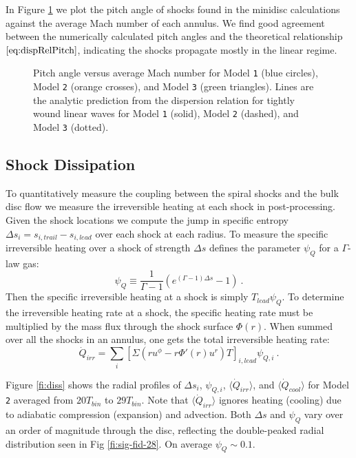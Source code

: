 \documentclass{emulateapj}
\newcommand{\Gam}{\Gamma}
\newcommand{\De}{\Delta}
\newcommand{\model}[1]{{Model \texttt{#1}}}
\newcommand{\avet}[1]{ \langle #1 \rangle}
\begin{document}
In Figure \ref{fi:disp} we plot the pitch angle of shocks found in the minidisc calculations against the average Mach number of each annulus. We find good agreement between the numerically calculated pitch angles and the theoretical relationship $\eqref{eq:dispRelPitch}$, indicating the shocks propagate mostly in the linear regime.

\begin{figure}
\caption{\label{fi:disp} Pitch angle versus average Mach number for \model{1} (blue circles), \model{2} (orange crosses), and \model{3} (green triangles). Lines are the analytic prediction from the dispersion relation for tightly wound linear waves for \model{1} (solid), \model{2} (dashed), and \model{3} (dotted).}
\end{figure}



\subsection{Shock Dissipation}
\label{subsec:diss}

To quantitatively measure the coupling between the spiral shocks and the bulk disc flow we measure the irreversible heating at each shock in post-processing.  Given the shock locations we compute the jump in specific entropy $\Delta s_i = s_{i,trail} - s_{i,lead}$ over each shock at each radius.  To measure the specific irreversible heating over a shock of strength $\De s$ \cite{Rafikov16} defines the parameter $\psi_Q$ for a $\Gam$-law gas:
\begin{equation}
	\psi_Q \equiv \frac{1}{\Gam - 1} \left( e^{(\Gam -1)\De s } - 1 \right) \ . \label{eq:def-psi}
\end{equation}
Then the specific irreversible heating at a shock is simply $T_{lead} \psi_Q$.  To determine the irreversible heating rate at a shock, the specific heating rate must be multiplied by the mass flux through the shock surface $\Phi(r)$.  When summed over all the shocks in an annulus, one gets the total irreversible heating rate:
\begin{equation}
	\dot{Q}_{irr} = \sum_i \left[ \Sigma \left(r u^\phi - r \Phi'(r) u^r \right) T \right]_{i,lead} \psi_{Q,i} \ . \label{eq:QirrRaf}
\end{equation}

Figure \ref{fi:diss} shows the radial profiles of $\Delta s_i$, $\psi_{Q,i}$, $\avet{\dot{Q}_{irr}}$, and $\avet{\dot{Q}_{cool}}$ for \model{2} averaged from $20 T_{bin}$ to $29 T_{bin}$.  Note that $\avet{\dot{Q}_{irr}}$ ignores heating (cooling) due to adiabatic compression (expansion) and advection.  Both $\De s$ and $\psi_Q$ vary over an order of magnitude through the disc, reflecting the double-peaked radial distribution seen in Fig \ref{fi:sig-fid-28}. On average $\psi_Q \sim 0.1$.  
\end{document}
